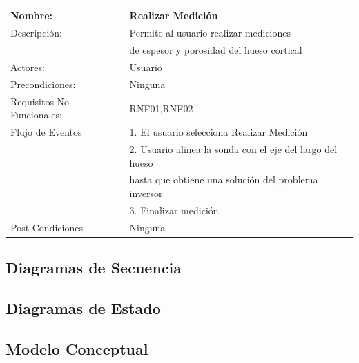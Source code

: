 \begin{table}[H]
\begin{tabular}{ll}


\hline
Nombre:                     & Realizar Medición \\ \hline
Descripción:                & Permite al usuario realizar mediciones\\ &de espesor
y porosidad del hueso cortical  \\ \hline
Actores:                    & Usuario           \\ \hline
Precondiciones:             & Ninguna           \\ \hline
Requisitos No Funcionales: & RNF01,RNF02            \\ \hline
Flujo de Eventos      & 1. El usuario selecciona Realizar Medición \\
&2. Usuario alinea la sonda con el eje del largo del hueso\\
& hasta que obtiene una solución del problema inversor  \\
& 3. Finalizar medición.              \\ \hline
Post-Condiciones            & Ninguna           \\ \hline
\end{tabular}
\end{table}




\subsection{Diagramas de Secuencia}
\label{ssc:DSS}

\subsection{Diagramas de Estado}
\label{ssc:DE}


\subsection{Modelo Conceptual}
\label{ssc:MC}
